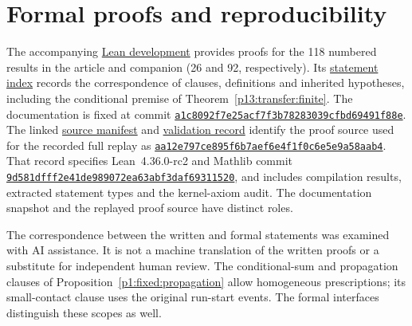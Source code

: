 \section*{Formal proofs and reproducibility}
The accompanying
\href{https://github.com/Vulkin-prog/paper-p1-lean}{Lean development}
provides proofs for the 118 numbered results in the article and companion
(26 and 92, respectively). Its
\href{https://github.com/Vulkin-prog/paper-p1-lean/blob/a1c8092f7e25acf7f3b78283039cfbd69491f88e/docs/manuscript-results-v2.0.json}{statement index}
records the correspondence of clauses, definitions and inherited
hypotheses, including the conditional premise of
Theorem~\ref{p13:transfer:finite}.
The documentation is fixed at commit
\href{https://github.com/Vulkin-prog/paper-p1-lean/tree/a1c8092f7e25acf7f3b78283039cfbd69491f88e}{\texttt{a1c8092f7e25acf7f3b78283039cfbd69491f88e}}.
The linked
\href{https://github.com/Vulkin-prog/paper-p1-lean/blob/a1c8092f7e25acf7f3b78283039cfbd69491f88e/docs/validation/v2.0/proof-source-manifest.json}{source manifest}
and
\href{https://github.com/Vulkin-prog/paper-p1-lean/blob/a1c8092f7e25acf7f3b78283039cfbd69491f88e/docs/validation/v2.0/validation.json}{validation record}
identify the proof source used for the recorded full replay as
\href{https://github.com/Vulkin-prog/paper-p1-lean/tree/aa12e797ce895f6b7aef6e4f1f0c6e5e9a58aab4}{\texttt{aa12e797ce895f6b7aef6e4f1f0c6e5e9a58aab4}}.
That record specifies Lean~4.36.0-rc2 and Mathlib commit
\href{https://github.com/leanprover-community/mathlib4/tree/9d581dfff2e41de989072ea63abf3daf69311520}{\texttt{9d581dfff2e41de989072ea63abf3daf69311520}},
and includes compilation results, extracted statement types and the
kernel-axiom audit. The documentation snapshot and the replayed proof
source have distinct roles.

The correspondence between the written and formal statements was
examined with AI assistance. It is not a machine translation of the
written proofs or a substitute for independent human review.
The conditional-sum and propagation clauses of
Proposition~\ref{p1:fixed:propagation} allow homogeneous prescriptions;
its small-contact clause uses the original run-start events. The formal
interfaces distinguish these scopes as well.

